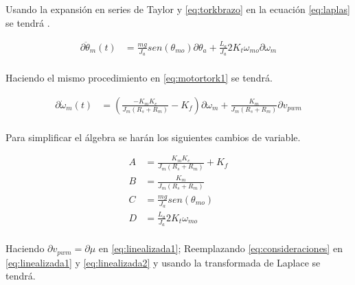 \documentclass[a4paper]{IEEEtran} %
\begin{document}
Usando la expansión en series de Taylor y \ref{eq:torkbrazo} en la ecuación \ref{eq:laplas} se tendrá .

\begin{equation}
    \begin{split}
        \partial\ddot{\theta}_{m}(t)&=\frac{mg}{J_{a}}sen(\theta_{mo})\partial\theta_{a}+\frac{L_{a}}{J_{a}}2K_{t}\omega_{mo}\partial\omega_{m}\\
    \end{split}
    \label{eq:linealizada1}
\end{equation}

Haciendo el mismo procedimiento en \ref{eq:motortork1} se tendrá.

\begin{equation}
    \begin{split}
        \partial\dot{\omega}_{m}(t)&=(\frac{-K_{m}K_{e}}{J_{m}(R_{s}+R_{m})}-K_{f})\partial\omega_{m}+\frac{K_{m}}{J_{m}(R_{s}+R_{m})}\partial v_{pwm}\\
    \end{split}
    \label{eq:linealizada2}
\end{equation}
\vspace{1mm}

Para simplificar el álgebra se harán los siguientes cambios de variable.

\begin{equation}
    \begin{split}
        A&=\frac{K_{m}K_{e}}{J_{m}(R_{s}+R_{m})}+K_{f}\\
        B&=\frac{K_{m}}{J_{m}(R_{s}+R_{m})}\\
        C&=\frac{mg}{J_{a}}sen(\theta_{mo})\\
        D&=\frac{L_{a}}{J_{a}}2K_{t}\omega_{mo}\\
    \end{split}
    \label{eq:consideraciones}
\end{equation}


Haciendo $\partial v_{pwm}=\partial \mu$ en \ref{eq:linealizada1}; Reemplazando \ref{eq:consideraciones} en \ref{eq:linealizada1} y \ref{eq:linealizada2} y usando la transformada de Laplace se tendrá.
\end{document}
